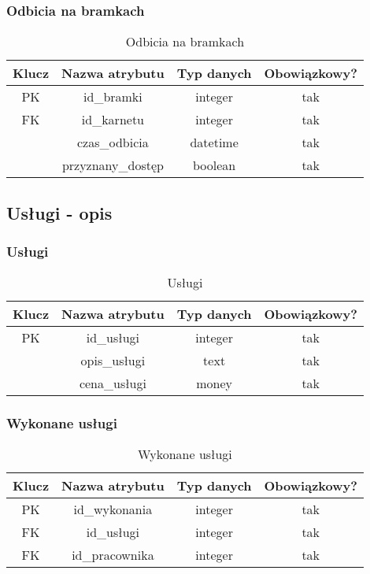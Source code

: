 \subsubsection{Odbicia na bramkach}
\begin{table}[H]
	\centering
	\begin{tabular}{|c|c|c|c|}
		\hline
		Klucz & Nazwa atrybutu     & Typ danych & Obowiązkowy? \\ \hline
		PK    & id\_bramki         & integer    & tak           \\ \hline
		FK    & id\_karnetu        & integer    & tak           \\ \hline
		      & czas\_odbicia      & datetime   & tak           \\ \hline
		      & przyznany\_dostęp & boolean    & tak           \\ \hline
	\end{tabular}
	\caption{Odbicia na bramkach}
\end{table}

\subsection{Usługi - opis}
\subsubsection{Usługi}
\begin{table}[H]
	\centering
	\begin{tabular}{|c|c|c|c|}
		\hline
		Klucz & Nazwa atrybutu & Typ danych & Obowiązkowy? \\ \hline
		PK    & id\_usługi    & integer    & tak           \\ \hline
		      & opis\_usługi  & text       & tak           \\ \hline
		      & cena\_usługi  & money      & tak           \\ \hline
	\end{tabular}
	\caption{Usługi}
\end{table}

\subsubsection{Wykonane usługi}
\begin{table}[H]
	\centering
	\begin{tabular}{|c|c|c|c|}
		\hline
		Klucz & Nazwa atrybutu & Typ danych & Obowiązkowy? \\ \hline
		PK    & id\_wykonania  & integer    & tak           \\ \hline
		FK    & id\_usługi    & integer    & tak           \\ \hline
		FK    & id\_pracownika & integer    & tak           \\ \hline
	\end{tabular}
	\caption{Wykonane usługi}
\end{table}
